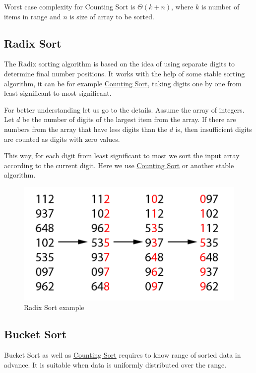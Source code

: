 \documentclass[
  field=inf,
  biblatex,
  language=english,
  glossaries,
  index
]{kidiplom}
\begin{document}
Worst case complexity for Counting Sort is $\Theta(k + n)$, where $k$ is number of items in range and $n$ is size of array to be sorted.

\subsection{Radix Sort}

The Radix sorting algorithm is based on the idea of using separate digits to determine final number positions. It works with the help of some stable sorting algorithm, it can be for example \hyperref[sec:counting]{Counting Sort}, taking digits one by one from least significant to most significant.

For better understanding let us go to the details. Assume the array of integers. Let $d$ be the number of digits of the largest item from the array. If there are numbers from the array that have less digits than the $d$ is, then insufficient digits are counted as digits with zero values.

This way, for each digit from least significant to most we sort the input array according to the current digit. Here we use \hyperref[sec:counting]{Counting Sort} or another stable algorithm.

\begin{figure}[H]
\begin{center}
	
	\includegraphics[scale=2]{img/Radixsort.png}
	\caption{Radix Sort example}\label{fig:radixsort}
\end{center}
\end{figure}

\subsection{Bucket Sort}

Bucket Sort as well as \hyperref[sec:counting]{Counting Sort} requires to know range of sorted data in advance. It is suitable when data is uniformly distributed over the range.
\end{document}
